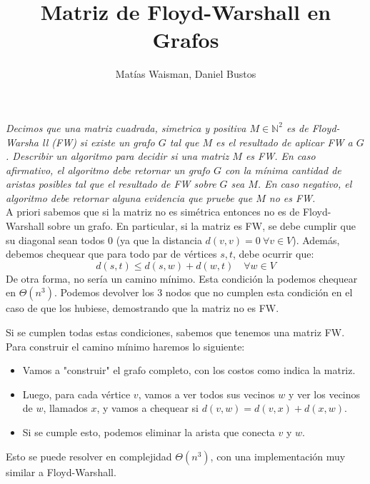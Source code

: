 \documentclass{article}
\title{Matriz de Floyd-Warshall en Grafos}
\author{Matías Waisman, Daniel Bustos}
\begin{document}
\maketitle
\textit{Decimos que una matriz cuadrada, simetrica y positiva \( M \in \mathbb{N}^{2} \) es de Floyd-Warsha ll (FW) si existe un grafo \( G \) tal que \( M \) es el resultado de aplicar FW a \( G \). Describir un algoritmo para decidir si una matriz \( M \) es FW. En caso afirmativo, el algoritmo debe retornar un grafo \( G \) con la mínima cantidad de aristas posibles tal que el resultado de FW sobre \( G \) sea \( M \). En caso negativo, el algoritmo debe retornar alguna evidencia que pruebe que \( M \) no es FW.} \\

A priori sabemos que si la matriz no es simétrica entonces no es de Floyd-Warshall sobre un grafo. En particular, si la matriz es FW, se debe cumplir que su diagonal sean todos \( 0 \) (ya que la distancia \( d(v,v) = 0 \ \forall v \in V \)). Además, debemos chequear que para todo par de vértices \( s,t \), debe ocurrir que:
\[
d(s,t) \leq d(s,w) + d(w,t) \quad \forall w \in V
\]
De otra forma, no sería un camino mínimo. Esta condición la podemos chequear en \( \Theta(n^{3}) \). Podemos devolver los 3 nodos que no cumplen esta condición en el caso de que los hubiese, demostrando que la matriz no es FW.

Si se cumplen todas estas condiciones, sabemos que tenemos una matriz FW. Para construir el camino mínimo haremos lo siguiente: 
\begin{itemize}
    \item Vamos a "construir" el grafo completo, con los costos como indica la matriz.
    \item Luego, para cada vértice \( v \), vamos a ver todos sus vecinos \( w \) y ver los vecinos de \( w \), llamados \( x \), y vamos a chequear si \( d(v,w) = d(v,x) + d(x,w) \).
    \item Si se cumple esto, podemos eliminar la arista que conecta \( v \) y \( w \).
\end{itemize}
Esto se puede resolver en complejidad \( \Theta(n^{3}) \), con una implementación muy similar a Floyd-Warshall.
\end{document}
